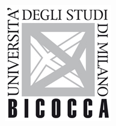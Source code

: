 \documentclass[12pt]{article}
\begin{document}
\begin{titlepage}

\includegraphics{logo.jpg}\\[3cm] %
 

\vfill %

\end{titlepage}
\end{document}
